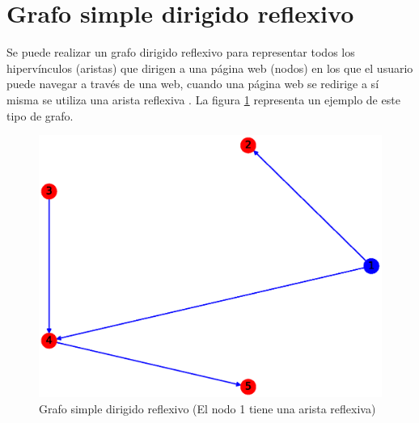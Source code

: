 \documentclass{article}
\begin{document}
\section{Grafo simple dirigido reflexivo}
Se  puede realizar un grafo dirigido reflexivo para representar todos los hipervínculos (aristas) que dirigen a una página web (nodos) en los que el usuario puede navegar a través de una web, cuando una página web se redirige a sí misma se utiliza una arista reflexiva \cite{GSDA}. La figura \ref{fig:GSDR} representa un ejemplo de este tipo de grafo.
\begin{figure}[h!]
    \includegraphics[width=\textwidth]{6-GSDR}
    \caption{Grafo simple dirigido reflexivo (El nodo 1 tiene una arista reflexiva)}
    \label{fig:GSDR}
\end{figure}



\end{document}
